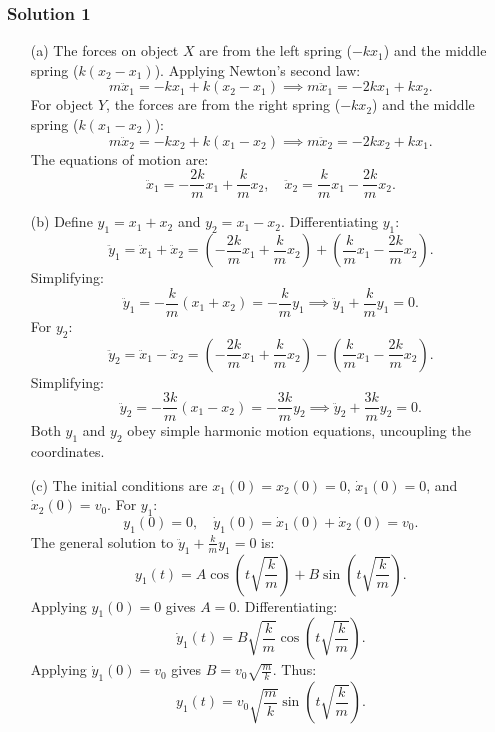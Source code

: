 \documentclass{article}
\begin{document}
\subsubsection{Solution 1}
\begin{enumerate}
    \item[(a)] The forces on object $X$ are from the left spring ($-kx_1$) and the middle spring ($k(x_2 - x_1)$). Applying Newton's second law:
    \[
    m \ddot{x}_1 = -kx_1 + k(x_2 - x_1) \implies m \ddot{x}_1 = -2kx_1 + kx_2.
    \]
    For object $Y$, the forces are from the right spring ($-kx_2$) and the middle spring ($k(x_1 - x_2)$):
    \[
    m \ddot{x}_2 = -kx_2 + k(x_1 - x_2) \implies m \ddot{x}_2 = -2kx_2 + kx_1.
    \]
    The equations of motion are:
    \[
    \ddot{x}_1 = -\frac{2k}{m}x_1 + \frac{k}{m}x_2, \quad \ddot{x}_2 = \frac{k}{m}x_1 - \frac{2k}{m}x_2.
    \]
    
    \item[(b)] Define $y_1 = x_1 + x_2$ and $y_2 = x_1 - x_2$. Differentiating $y_1$:
    \[
    \ddot{y}_1 = \ddot{x}_1 + \ddot{x}_2 = \left(-\frac{2k}{m}x_1 + \frac{k}{m}x_2\right) + \left(\frac{k}{m}x_1 - \frac{2k}{m}x_2\right).
    \]
    Simplifying:
    \[
    \ddot{y}_1 = -\frac{k}{m}(x_1 + x_2) = -\frac{k}{m}y_1 \implies \ddot{y}_1 + \frac{k}{m}y_1 = 0.
    \]
    For $y_2$:
    \[
    \ddot{y}_2 = \ddot{x}_1 - \ddot{x}_2 = \left(-\frac{2k}{m}x_1 + \frac{k}{m}x_2\right) - \left(\frac{k}{m}x_1 - \frac{2k}{m}x_2\right).
    \]
    Simplifying:
    \[
    \ddot{y}_2 = -\frac{3k}{m}(x_1 - x_2) = -\frac{3k}{m}y_2 \implies \ddot{y}_2 + \frac{3k}{m}y_2 = 0.
    \]
    Both $y_1$ and $y_2$ obey simple harmonic motion equations, uncoupling the coordinates.
    
    \item[(c)] The initial conditions are $x_1(0) = x_2(0) = 0$, $\dot{x}_1(0) = 0$, and $\dot{x}_2(0) = v_0$. For $y_1$:
    \[
    y_1(0) = 0, \quad \dot{y}_1(0) = \dot{x}_1(0) + \dot{x}_2(0) = v_0.
    \]
    The general solution to $\ddot{y}_1 + \frac{k}{m}y_1 = 0$ is:
    \[
    y_1(t) = A\cos\left(t\sqrt{\frac{k}{m}}\right) + B\sin\left(t\sqrt{\frac{k}{m}}\right).
    \]
    Applying $y_1(0) = 0$ gives $A = 0$. Differentiating:
    \[
    \dot{y}_1(t) = B\sqrt{\frac{k}{m}}\cos\left(t\sqrt{\frac{k}{m}}\right).
    \]
    Applying $\dot{y}_1(0) = v_0$ gives $B = v_0\sqrt{\frac{m}{k}}$. Thus:
    \[
    y_1(t) = v_0\sqrt{\frac{m}{k}}\sin\left(t\sqrt{\frac{k}{m}}\right).
    \]
\end{enumerate}
\end{document}
